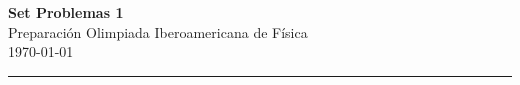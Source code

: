 












\textcolor{DS_Black}{
\begin{minipage}{0.85\textwidth}
    \begin{center}
        \textbf{\Large Set Problemas 1}\\
        \vspace{5pt}
        Preparación Olimpiada Iberoamericana de Física \\
        \vspace{20pt}
        \today
    \end{center}
\end{minipage}
\vspace{10pt}
\hrule
}